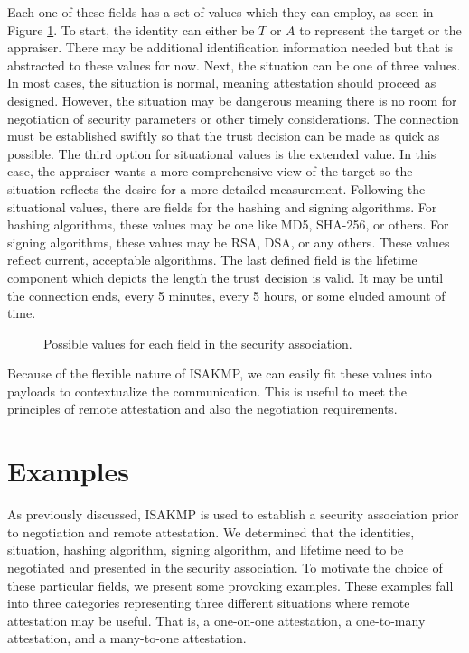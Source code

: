 \documentclass[12pt, letterpaper, twoside]{article}
\begin{document}
Each one of these fields has a set of values which they can employ, as seen in Figure \ref{fig:values}. To start, the identity can either be $T$ or $A$ to represent the target or the appraiser. There may be additional identification information needed but that is abstracted to these values for now. Next, the situation can be one of three values. In most cases, the situation is normal, meaning attestation should proceed as designed. However, the situation may be dangerous meaning there is no room for negotiation of security parameters or other timely considerations. The connection must be established swiftly so that the trust decision can be made as quick as possible. The third option for situational values is the extended value. In this case, the appraiser wants a more comprehensive view of the target  so the situation reflects the desire for a more detailed measurement. Following the situational values, there are fields for the hashing and signing algorithms. For hashing algorithms, these values may be one like MD5, SHA-256, or others. For signing algorithms, these values may be RSA, DSA, or any others. These values reflect current, acceptable algorithms. The last defined field is the lifetime component which depicts the length the trust decision is valid. It may be until the connection ends, every 5 minutes, every 5 hours, or some eluded amount of time.

\begin{figure}[hbtp]
    \centering
    
    \caption{Possible values for each field in the security association. }
    \label{fig:values}
\end{figure}

Because of the flexible nature of ISAKMP, we can easily fit these values into payloads to contextualize the communication. This is useful to meet the principles of remote attestation and also the negotiation requirements. 

\section{Examples}

As previously discussed, ISAKMP is used to establish a security association prior to negotiation and remote attestation. We determined that the identities, situation, hashing algorithm, signing algorithm, and lifetime need to be negotiated and presented in the security association. To motivate the choice of these particular fields, we present some provoking examples. These examples fall into three categories representing three different situations where remote attestation may be useful. That is, a one-on-one attestation, a one-to-many attestation, and a many-to-one attestation.   
\end{document}
